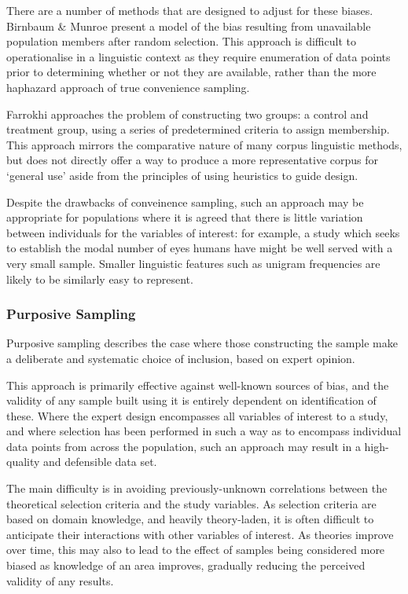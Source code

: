 There are a number of methods that are designed to adjust for these biases.  Birnbaum \& Munroe\cite{birnbaum1950munroe} present a model of the bias resulting from unavailable population members after random selection.  This approach is difficult to operationalise in a linguistic context as they require enumeration of data points prior to determining whether or not they are available, rather than the more haphazard approach of true convenience sampling.

Farrokhi\cite{farrokhi2012rethinking} approaches the problem of constructing two groups: a control and treatment group, using a series of predetermined criteria to assign membership.  This approach mirrors the comparative nature of many corpus linguistic methods, but does not directly offer a way to produce a more representative corpus for `general use' aside from the principles of using heuristics to guide design.

Despite the drawbacks of conveinence sampling, such an approach may be appropriate for populations where it is agreed that there is little variation between individuals for the variables of interest: for example, a study which seeks to establish the modal number of eyes humans have might be well served with a very small sample.  Smaller linguistic features such as unigram frequencies are likely to be similarly easy to represent.



\subsubsection{Purposive Sampling}
Purposive sampling describes the case where those constructing the sample make a deliberate and systematic choice of inclusion, based on expert opinion.

This approach is primarily effective against well-known sources of bias, and the validity of any sample built using it is entirely dependent on identification of these.  Where the expert design encompasses all variables of interest to a study, and where selection has been performed in such a way as to encompass individual data points from across the population, such an approach may result in a high-quality and defensible data set.

The main difficulty is in avoiding previously-unknown correlations between the theoretical selection criteria and the study variables.  As selection criteria are based on domain knowledge, and heavily theory-laden, it is often difficult to anticipate their interactions with other variables of interest.  As theories improve over time, this may also to lead to the effect of samples being considered more biased as knowledge of an area improves, gradually reducing the perceived validity of any results.

